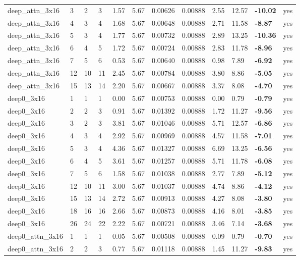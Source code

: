 \documentclass[10pt,a4paper]{article}
\begin{document}
\begin{landscape}
\begin{footnotesize}
\begin{longtable}{llllllllllll}
deep\_attn\_3x16 & 3 & 2 & 3 & 1.57 & 5.67 & 0.00626 & 0.00888 & 2.55 & 12.57 & \textbf{-10.02} & yes \\
deep\_attn\_3x16 & 4 & 3 & 4 & 1.68 & 5.67 & 0.00648 & 0.00888 & 2.71 & 11.58 & \textbf{-8.87} & yes \\
deep\_attn\_3x16 & 5 & 3 & 4 & 1.77 & 5.67 & 0.00732 & 0.00888 & 2.89 & 13.25 & \textbf{-10.36} & yes \\
deep\_attn\_3x16 & 6 & 4 & 5 & 1.72 & 5.67 & 0.00724 & 0.00888 & 2.83 & 11.78 & \textbf{-8.96} & yes \\
deep\_attn\_3x16 & 7 & 5 & 6 & 0.53 & 5.67 & 0.00640 & 0.00888 & 0.98 & 7.89 & \textbf{-6.92} & yes \\
deep\_attn\_3x16 & 12 & 10 & 11 & 2.45 & 5.67 & 0.00784 & 0.00888 & 3.80 & 8.86 & \textbf{-5.05} & yes \\
deep\_attn\_3x16 & 15 & 13 & 14 & 2.20 & 5.67 & 0.00667 & 0.00888 & 3.37 & 8.08 & \textbf{-4.70} & yes \\
deep0\_3x16 & 1 & 1 & 1 & 0.00 & 5.67 & 0.00753 & 0.00888 & 0.00 & 0.79 & \textbf{-0.79} & yes \\
deep0\_3x16 & 2 & 2 & 3 & 0.91 & 5.67 & 0.01392 & 0.00888 & 1.72 & 11.27 & \textbf{-9.56} & yes \\
deep0\_3x16 & 3 & 2 & 3 & 3.81 & 5.67 & 0.01046 & 0.00888 & 5.71 & 12.57 & \textbf{-6.86} & yes \\
deep0\_3x16 & 4 & 3 & 4 & 2.92 & 5.67 & 0.00969 & 0.00888 & 4.57 & 11.58 & \textbf{-7.01} & yes \\
deep0\_3x16 & 5 & 3 & 4 & 4.36 & 5.67 & 0.01327 & 0.00888 & 6.69 & 13.25 & \textbf{-6.56} & yes \\
deep0\_3x16 & 6 & 4 & 5 & 3.61 & 5.67 & 0.01257 & 0.00888 & 5.71 & 11.78 & \textbf{-6.08} & yes \\
deep0\_3x16 & 7 & 5 & 6 & 1.58 & 5.67 & 0.01038 & 0.00888 & 2.77 & 7.89 & \textbf{-5.12} & yes \\
deep0\_3x16 & 12 & 10 & 11 & 3.00 & 5.67 & 0.01037 & 0.00888 & 4.74 & 8.86 & \textbf{-4.12} & yes \\
deep0\_3x16 & 15 & 13 & 14 & 2.72 & 5.67 & 0.00913 & 0.00888 & 4.27 & 8.08 & \textbf{-3.80} & yes \\
deep0\_3x16 & 18 & 16 & 16 & 2.66 & 5.67 & 0.00873 & 0.00888 & 4.16 & 8.01 & \textbf{-3.85} & yes \\
deep0\_3x16 & 26 & 24 & 22 & 2.22 & 5.67 & 0.00721 & 0.00888 & 3.46 & 7.14 & \textbf{-3.68} & yes \\
deep0\_attn\_3x16 & 1 & 1 & 1 & 0.05 & 5.67 & 0.00508 & 0.00888 & 0.09 & 0.79 & \textbf{-0.70} & yes \\
deep0\_attn\_3x16 & 2 & 2 & 3 & 0.77 & 5.67 & 0.01118 & 0.00888 & 1.45 & 11.27 & \textbf{-9.83} & yes \\
\bottomrule \end{longtable}
\end{footnotesize}
\end{landscape}
\end{document}
